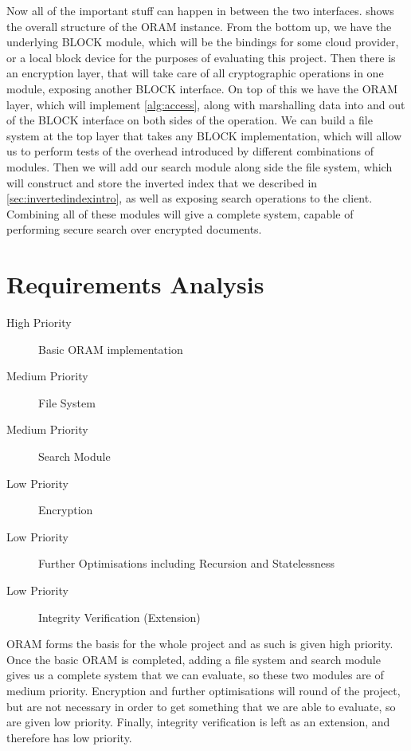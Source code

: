 \documentclass[12pt,a4paper,twoside,openright]{report}
\begin{document}
Now all of the important stuff can happen in between the two interfaces.  shows the overall structure of the ORAM instance. From the bottom up, we have the underlying BLOCK module, which will be the bindings for some cloud provider, or a local block device for the purposes of evaluating this project. Then there is an encryption layer, that will take care of all cryptographic operations in one module, exposing another BLOCK interface. On top of this we have the ORAM layer, which will implement \cref{alg:access}, along with marshalling data into and out of the BLOCK interface on both sides of the operation. We can build a file system at the top layer that takes any BLOCK implementation, which will allow us to perform tests of the overhead introduced by different combinations of modules. Then we will add our search module along side the file system, which will construct and store the inverted index that we described in \cref{sec:invertedindexintro}, as well as exposing search operations to the client. Combining all of these modules will give a complete system, capable of performing secure search over encrypted documents.

\section{Requirements Analysis}


\begin{description}
	\item [High Priority] Basic ORAM implementation
	\item [Medium Priority] File System
	\item [Medium Priority] Search Module
	\item [Low Priority] Encryption
	\item [Low Priority] Further Optimisations including Recursion and Statelessness
	\item [Low Priority] Integrity Verification (Extension)
\end{description}

ORAM forms the basis for the whole project and as such is given high priority. Once the basic ORAM is completed, adding a file system and search module gives us a complete system that we can evaluate, so these two modules are of medium priority. Encryption and further optimisations will round of the project, but are not necessary in order to get something that we are able to evaluate, so are given low priority. Finally, integrity verification is left as an extension, and therefore has low priority.
\end{document}
